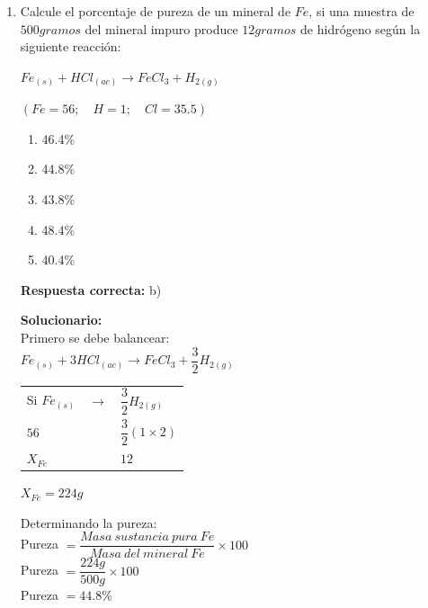 \begin{enumerate}
	
	
	
	
	
	\item Calcule el porcentaje de pureza de un mineral de $Fe$, si una muestra de $500 gramos$ del mineral impuro produce $12 gramos$ de hidrógeno según la siguiente reacción:
	
	$Fe_{(s)} + HCl_{(ac)} \longrightarrow FeCl_3 + H_{2(g)}$
	
	$(Fe = 56; \quad H = 1; \quad Cl = 35.5)$
	
	\begin{enumerate}[label=\alph*)]
		\item 46.4\%
		\item 44.8\%
		\item 43.8\%
		\item 48.4\%
		\item 40.4\%
	\end{enumerate}
	
	\textbf{Respuesta correcta:} b)
	
	\vspace{2mm}
	\textbf{Solucionario:}\\
	Primero se debe balancear: \\
	$Fe_{(s)} + 3HCl_{(ac)} \rightarrow FeCl_3 + \dfrac{3}{2}H_{2(g)}$
	
	\vspace{2mm}
	\begin{tabular}{l c l}
		Si $Fe_{(s)}$ & \textemdash $\rightarrow$ & $\dfrac{3}{2} H_{2(g)}$ \\
		
		
		$56$ & \textemdash & $\dfrac{3}{2}(1 \times 2)$ \\
		
		$X_{Fe}$ & \textemdash & $12$ \\
	\end{tabular}
	
	\vspace{2mm}
	$X_{Fe} = 224g$
	
	\vspace{4mm}
	Determinando la pureza: \\
	Pureza $= \dfrac{Masa \: sustancia \: pura \: Fe}{Masa \: del \: mineral \: Fe} \times 100$ \\
	
	Pureza $= \dfrac{224g}{500g} \times 100$ \\
	Pureza $= 44.8\%$
	
	\vspace{6mm}
	

\end{enumerate}
